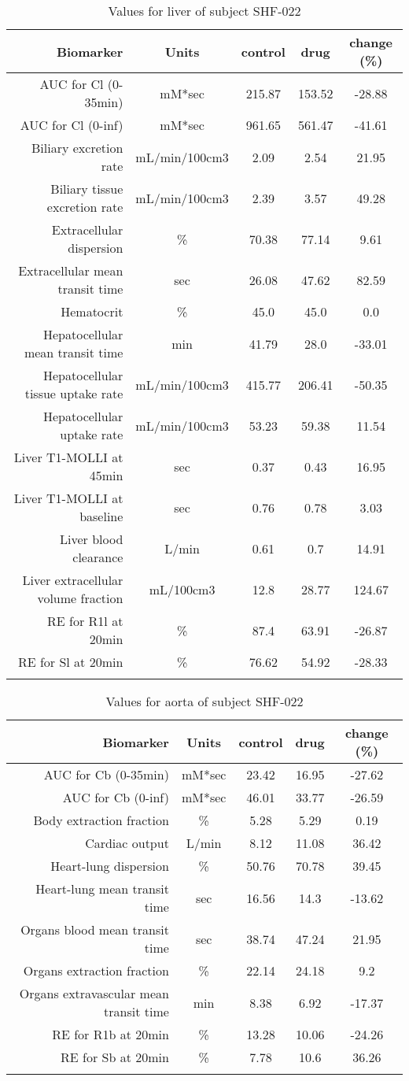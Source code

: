 \documentclass{epflreport}%
\begin{document}
%
\clearpage%
\begin{longtable}{rcccc}%
\hline%
Biomarker&Units&control&drug&change (\%)\\%
\hline%
AUC for Cl (0{-}35min)&mM*sec&215.87&153.52&{-}28.88\\%
AUC for Cl (0{-}inf)&mM*sec&961.65&561.47&{-}41.61\\%
Biliary excretion rate&mL/min/100cm3&2.09&2.54&21.95\\%
Biliary tissue excretion rate&mL/min/100cm3&2.39&3.57&49.28\\%
Extracellular dispersion&\%&70.38&77.14&9.61\\%
Extracellular mean transit time&sec&26.08&47.62&82.59\\%
Hematocrit&\%&45.0&45.0&0.0\\%
Hepatocellular mean transit time&min&41.79&28.0&{-}33.01\\%
Hepatocellular tissue uptake rate&mL/min/100cm3&415.77&206.41&{-}50.35\\%
Hepatocellular uptake rate&mL/min/100cm3&53.23&59.38&11.54\\%
Liver T1{-}MOLLI at 45min&sec&0.37&0.43&16.95\\%
Liver T1{-}MOLLI at baseline&sec&0.76&0.78&3.03\\%
Liver blood clearance&L/min&0.61&0.7&14.91\\%
Liver extracellular volume fraction&mL/100cm3&12.8&28.77&124.67\\%
RE for R1l at 20min&\%&87.4&63.91&{-}26.87\\%
RE for Sl at 20min&\%&76.62&54.92&{-}28.33\\%
\hline%
\caption{Values for liver of subject SHF-022} \\%
\end{longtable}%
\begin{longtable}{rcccc}%
\hline%
Biomarker&Units&control&drug&change (\%)\\%
\hline%
AUC for Cb (0{-}35min)&mM*sec&23.42&16.95&{-}27.62\\%
AUC for Cb (0{-}inf)&mM*sec&46.01&33.77&{-}26.59\\%
Body extraction fraction&\%&5.28&5.29&0.19\\%
Cardiac output&L/min&8.12&11.08&36.42\\%
Heart{-}lung dispersion&\%&50.76&70.78&39.45\\%
Heart{-}lung mean transit time&sec&16.56&14.3&{-}13.62\\%
Organs blood mean transit time&sec&38.74&47.24&21.95\\%
Organs extraction fraction&\%&22.14&24.18&9.2\\%
Organs extravascular mean transit time&min&8.38&6.92&{-}17.37\\%
RE for R1b at 20min&\%&13.28&10.06&{-}24.26\\%
RE for Sb at 20min&\%&7.78&10.6&36.26\\%
\hline%
\caption{Values for aorta of subject SHF-022} \\%
\end{longtable}%
\clearpage%
\end{document}

